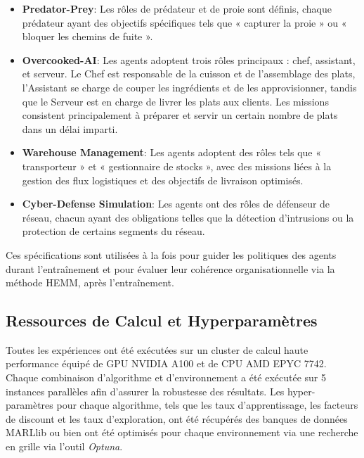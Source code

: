 \documentclass[sigconf,anonymous]{aamas}
\begin{document}
\begin{itemize}
    \item \textbf{Predator-Prey}: Les rôles de prédateur et de proie sont définis, chaque prédateur ayant des objectifs spécifiques tels que « capturer la proie » ou « bloquer les chemins de fuite ».
    

    \item \textbf{Overcooked-AI}: Les agents adoptent trois rôles principaux : chef, assistant, et serveur. Le Chef est responsable de la cuisson et de l'assemblage des plats, l'Assistant se charge de couper les ingrédients et de les approvisionner, tandis que le Serveur est en charge de livrer les plats aux clients. Les missions consistent principalement à préparer et servir un certain nombre de plats dans un délai imparti.
    
    \item \textbf{Warehouse Management}: Les agents adoptent des rôles tels que « transporteur » et « gestionnaire de stocks », avec des missions liées à la gestion des flux logistiques et des objectifs de livraison optimisés.
    
    \item \textbf{Cyber-Defense Simulation}: Les agents ont des rôles de défenseur de réseau, chacun ayant des obligations telles que la détection d'intrusions ou la protection de certains segments du réseau.
\end{itemize}

Ces spécifications sont utilisées à la fois pour guider les politiques des agents durant l'entraînement et pour évaluer leur cohérence organisationnelle via la méthode HEMM, après l'entraînement.

\subsection{Ressources de Calcul et Hyperparamètres}

Toutes les expériences ont été exécutées sur un cluster de calcul haute performance équipé de GPU NVIDIA A100 et de CPU AMD EPYC 7742. Chaque combinaison d'algorithme et d'environnement a été exécutée sur 5 instances parallèles afin d'assurer la robustesse des résultats. Les hyper-paramètres pour chaque algorithme, tels que les taux d'apprentissage, les facteurs de discount et les taux d'exploration, ont été récupérés des banques de données MARLlib ou bien ont été optimisés pour chaque environnement via une recherche en grille via l'outil \textit{Optuna}.
\end{document}
